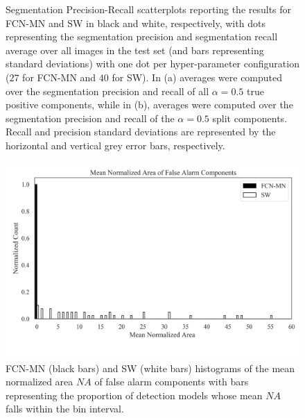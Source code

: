 \documentclass[a4paper,authoryear,review]{elsarticle}
\begin{document}
\begin{figure}
\begin{subfigure}[b]{0.97\textwidth}
       \caption{}
       \label{fig:Figure5-b}
  \end{subfigure}
\caption{
Segmentation Precision-Recall scatterplots reporting the results for FCN-MN and SW in black and white, respectively, with dots representing the segmentation precision and segmentation recall average over all images in the test set (and bars representing standard deviations) with one dot per hyper-parameter configuration ($27$ for FCN-MN and $40$ for SW). In (a) averages were computed over the segmentation precision and recall of all $\alpha=0.5$ true positive components, while in (b), averages were computed over the segmentation precision and recall of the $\alpha=0.5$ split components. Recall and precision standard deviations are represented by the horizontal and vertical grey error bars, respectively.
    }%
  \label{fig:Figure5}%
\end{figure}




\begin{figure}%
    \centering
     \includegraphics[width=\textwidth]{Figure6.png}%
\caption{
FCN-MN (black bars) and SW (white bars) histograms of the mean normalized area $NA$ of false alarm components with bars representing the proportion of detection models whose mean $NA$ falls within the bin interval.
    }
\label{fig:Figure6}
\end{figure}
\end{document}
